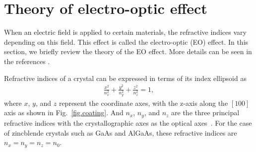 \section{Theory of electro-optic effect}
When an electric field is applied to certain materials, the refractive indices vary depending on this field.
This effect is called the electro-optic (EO) effect.
In this section, we briefly review the theory of the EO effect.
More details can be seen in the references \cite{Namba1961,yariv}.

Refractive indices of a crystal can be expressed in terms of its index ellipsoid as
\begin{align}
    \frac{x^2}{n_x^2} + \frac{y^2}{n_y^2} + \frac{z^2}{n_z^2} = 1,
    \label{eq.index}
\end{align}
where $x$, $y$, and $z$ represent the coordinate axes, with the z-axis along the $[100]$ axis as shown in Fig.~\ref{fig.coating}.
And $n_x$, $n_y$, and $n_z$ are the three principal refractive indices with the crystallographic axes as the optical axes~\cite{yariv}.
For the case of zincblende crystals such as GaAs and AlGaAs, these refractive indices are $n_x=n_y=n_z=n_0$.

